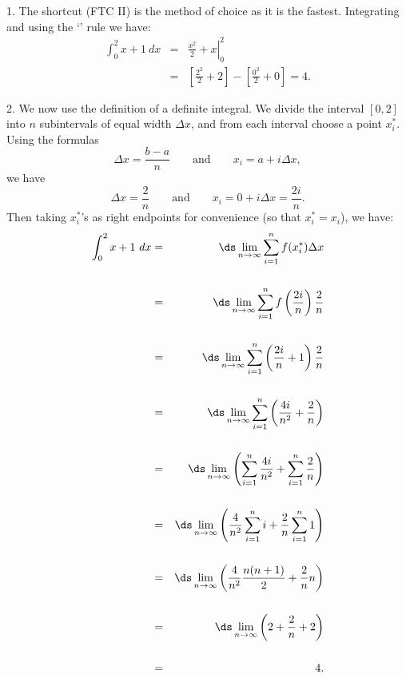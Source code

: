 \begin{solution} 
1. The shortcut (FTC II) is the method of choice as it is the fastest.
Integrating and using the `' rule we have:
\begin{eqnarray*}
\int_0^2 x+1~dx&=&\left.\frac{x^2}{2}+x\right|_0^2\\
&=&\left[\frac{2^2}{2}+2\right]-\left[\frac{0^2}{2}+0\right]=4.
\end{eqnarray*}

2. We now use the definition of a definite integral.
We divide the interval $[0,2]$ into $n$ subintervals of equal width $\Delta x$, and from each interval choose a point $x_i^*$.
Using the formulas
$$\Delta x = \frac{b-a}{n}\qquad\mbox{and}\qquad x_i=a+i\Delta x,$$
we have
$$\Delta x = \frac{2}{n}\qquad\mbox{and}\qquad x_i=0+i\Delta x=\frac{2i}{n}.$$
Then taking $x_i^*$'s as right endpoints for convenience (so that $x_i^*=x_i$), we have:
\begin{eqnarray*}
\int_0^2 x+1~dx & = & \ds\lim_{n\to\infty}\sum_{i=1}^n f(x_i^*)\Delta x\\
\\
& = & \ds\lim_{n\to\infty}\sum_{i=1}^n f\left(\frac{2i}{n}\right) \frac{2}{n}\\
\\
& = & \ds\lim_{n\to\infty}\sum_{i=1}^n \left(\frac{2i}{n}+1\right) \frac{2}{n}\\
\\
& = & \ds\lim_{n\to\infty}\sum_{i=1}^n \left(\frac{4i}{n^2}+\frac{2}{n}\right)\\
\\
& = & \ds\lim_{n\to\infty}\left(\sum_{i=1}^n \frac{4i}{n^2}+\sum_{i=1}^n \frac{2}{n} \right)\\
\\
& = & \ds\lim_{n\to\infty}\left(\frac{4}{n^2}\sum_{i=1}^n i+\frac{2}{n}\sum_{i=1}^n 1 \right)\\
\\
& = & \ds\lim_{n\to\infty}\left(\frac{4}{n^2}\frac{n(n+1)}{2}+\frac{2}{n}n \right)\\
\\
& = & \ds\lim_{n\to\infty}\left(2+\frac{2}{n}+2 \right)\\
\\
& = & 4.
\end{eqnarray*}


\end{solution}
